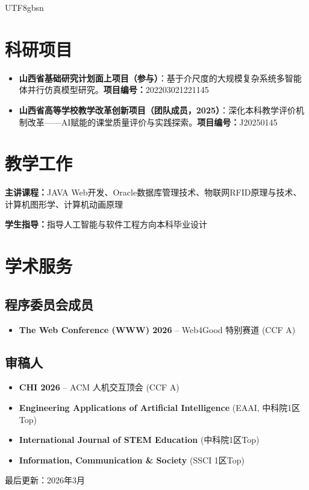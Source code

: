 \documentclass[a4paper,10pt]{article}
\newcommand{\cvlabel}[1]{\textbf{#1}}
\begin{document}
\begin{CJK*}{UTF8}{gbsn}
\section*{科研项目}

\begin{itemize}[leftmargin=*, topsep=0.2ex, itemsep=0.2ex]
    \item \cvlabel{山西省基础研究计划面上项目（参与）}：基于介尺度的大规模复杂系统多智能体并行仿真模型研究。\;\cvlabel{项目编号：}202203021221145
    \item \cvlabel{山西省高等学校教学改革创新项目（团队成员，2025）}：深化本科教学评价机制改革——AI赋能的课堂质量评价与实践探索。\;\cvlabel{项目编号：}J20250145
\end{itemize}

\section*{教学工作}

\noindent
\textbf{主讲课程：}JAVA Web开发、Oracle数据库管理技术、物联网RFID原理与技术、计算机图形学、计算机动画原理

\noindent
\textbf{学生指导：}指导人工智能与软件工程方向本科毕业设计

\section*{学术服务}

\subsection*{程序委员会成员}
\begin{itemize}[leftmargin=*]
    \item \textbf{The Web Conference (WWW) 2026} -- Web4Good 特别赛道 (CCF A)
\end{itemize}

\subsection*{审稿人}
\begin{itemize}[leftmargin=*]
    \item \textbf{CHI 2026} -- ACM 人机交互顶会 (CCF A)
    \item \textbf{Engineering Applications of Artificial Intelligence} (EAAI, 中科院1区Top)
    \item \textbf{International Journal of STEM Education} (中科院1区Top)
    \item \textbf{Information, Communication \& Society} (SSCI 1区Top)
\end{itemize}


\vfill
\begin{center}
    \small 最后更新：2026年3月
\end{center}

\ifPDFTeX
\end{CJK*}
\fi
\end{document}
